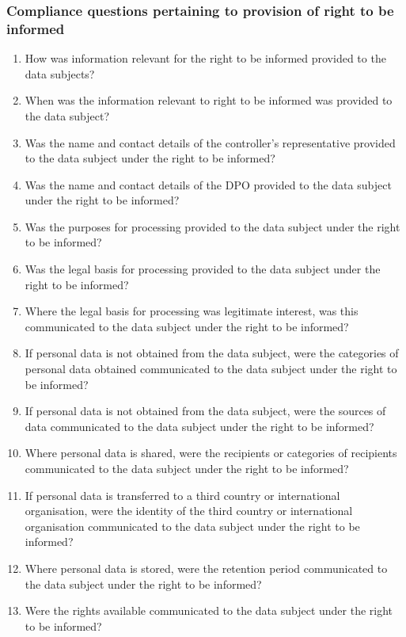 \subsubsection{Compliance questions pertaining to provision of right to be informed}\label{sec:info:CQ:7}
\begin{enumerate}[label={\textit{CMQ.\theenumi}},resume]
    \item How was information relevant for the right to be informed provided to the data subjects?
    \item When was the information relevant to right to be informed was provided to the data subject?
    \item Was the name and contact details of the controller’s representative provided to the data subject under the right to be informed?
    \item Was the name and contact details of the DPO provided to the data subject under the right to be informed?
    \item Was the purposes for processing provided to the data subject under the right to be informed?
    \item Was the legal basis for processing provided to the data subject under the right to be informed?
    \item Where the legal basis for processing was legitimate interest, was this communicated to the data subject under the right to be informed?
    \item If personal data is not obtained from the data subject, were the categories of personal data obtained communicated to the data subject under the right to be informed?
    \item If personal data is not obtained from the data subject, were the sources of data communicated to the data subject under the right to be informed?
    \item Where personal data is shared, were the recipients or categories of recipients communicated to the data subject under the right to be informed?
    \item If personal data is transferred to a third country or international organisation, were the identity of the third country or international organisation communicated to the data subject under the right to be informed?
    \item Where personal data is stored, were the retention period communicated to the data subject under the right to be informed?
    \item Were the rights available communicated to the data subject under the right to be informed?

\end{enumerate}
